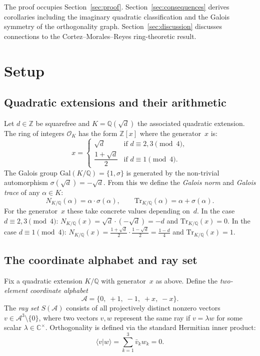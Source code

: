 \documentclass[12pt,a4paper]{article}
\newcommand{\C}{\mathbb{C}}
\newcommand{\Z}{\mathbb{Z}}
\newcommand{\Q}{\mathbb{Q}}
\newcommand{\Norm}[1]{N_{K/\Q}\!\left(#1\right)}
\newcommand{\Tr}[1]{\mathrm{Tr}_{K/\Q}\!\left(#1\right)}
\newcommand{\Gal}{\mathrm{Gal}}
\newcommand{\braket}[2]{\langle #1 | #2 \rangle}
\begin{document}
The proof occupies Section~\ref{sec:proof}.  Section~\ref{sec:consequences}
derives corollaries including the imaginary quadratic classification
and the Galois symmetry of the orthogonality graph.  Section~\ref{sec:discussion} discusses
connections to the Cortez--Morales--Reyes ring-theoretic result.

\section{Setup}\label{sec:setup}

\subsection{Quadratic extensions and their arithmetic}

Let $d \in \Z$ be squarefree and $K = \Q(\sqrt{d})$ the associated
quadratic extension.  The ring of integers $\mathcal{O}_K$ has the form
$\Z[x]$ where the generator~$x$ is:
\[
  x = \begin{cases}
    \sqrt{d} & \text{if } d \equiv 2, 3 \pmod{4}, \\
    \dfrac{1 + \sqrt{d}}{2} & \text{if } d \equiv 1 \pmod{4}.
  \end{cases}
\]
The Galois group $\Gal(K/\Q) = \{1, \sigma\}$ is generated by the
non-trivial automorphism $\sigma(\sqrt{d}) = -\sqrt{d}$.  From this we
define the \emph{Galois norm} and \emph{Galois trace} of any $\alpha \in
K$:
\[
  \Norm{\alpha} = \alpha \cdot \sigma(\alpha), \qquad
  \Tr{\alpha} = \alpha + \sigma(\alpha).
\]
For the generator~$x$ these take concrete values depending on~$d$.  In
the case $d \equiv 2, 3 \pmod{4}$: $\Norm{x} = \sqrt{d} \cdot
(-\sqrt{d}) = -d$ and $\Tr{x} = 0$.  In the case $d \equiv 1 \pmod{4}$:
$\Norm{x} = \tfrac{1+\sqrt{d}}{2} \cdot \tfrac{1-\sqrt{d}}{2} =
\tfrac{1-d}{4}$ and $\Tr{x} = 1$.

\subsection{The coordinate alphabet and ray set}

Fix a quadratic extension $K/\Q$ with generator~$x$ as above.  Define
the \emph{two-element coordinate alphabet}
\[
  \mathcal{A} = \{0,\; +1,\; -1,\; +x,\; -x\}.
\]
The \emph{ray set} $S(\mathcal{A})$ consists of all projectively distinct
nonzero vectors $v \in \mathcal{A}^3 \setminus \{0\}$, where two vectors
$v, w$ represent the same ray if $v = \lambda w$ for some scalar
$\lambda \in \C^\times$.  Orthogonality is defined via the standard
Hermitian inner product:
\[
  \braket{v}{w} = \sum_{k=1}^{3} \bar{v}_k w_k = 0.
\]
\end{document}
